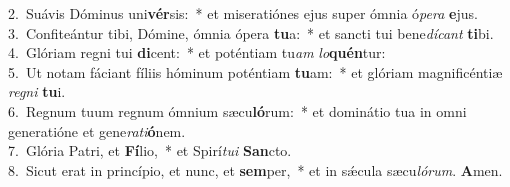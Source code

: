 {2.~}Suávis Dóminus uni\textbf{vér}sis:~* et miseratiónes ejus super ómnia ó\textit{pe}\textit{ra} \textbf{e}jus.\\
{3.~}Confiteántur tibi, Dómine, ómnia ópera \textbf{tu}a:~* et sancti tui bene\textit{dí}\textit{cant} \textbf{ti}bi.\\
{4.~}Glóriam regni tui \textbf{di}cent:~* et poténtiam tu\textit{am} \textit{lo}\textbf{quén}tur:\\
{5.~}Ut notam fáciant fíliis hóminum poténtiam \textbf{tu}am:~* et glóriam magnificéntiæ \textit{re}\textit{gni} \textbf{tu}i.\\
{6.~}Regnum tuum regnum ómnium sæcu\textbf{ló}rum:~* et dominátio tua in omni generatióne et gene\textit{ra}\textit{ti}\textbf{ó}nem.\\
{7.~}Glória Patri, et \textbf{Fí}lio,~* et Spirí\textit{tu}\textit{i} \textbf{San}cto.\\
{8.~}Sicut erat in princípio, et nunc, et \textbf{sem}per,~* et in sǽcula sæcu\textit{ló}\textit{rum}. \textbf{A}men.\\
